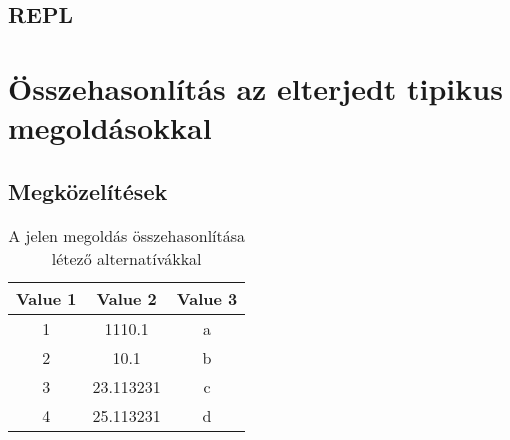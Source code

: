 \documentclass[
    parspace, %
    noindent, %
]{elteiktdk}[2023/10/30]
\begin{document}

\section{REPL}



\chapter{Összehasonlítás az elterjedt tipikus megoldásokkal}

\section{Megközelítések}



\begin{table}[h!]
  \begin{center}
    \begin{tabular}{|c|c|c|}
      \textbf{Value 1} &
      \textbf{Value 2} &
      \textbf{Value 3} \\
      \hline
      1 & 1110.1 & a\\
      2 & 10.1 & b\\
      3 & 23.113231 & c\\
      4 & 25.113231 & d\\ %
    \end{tabular}
    \caption{A jelen megoldás összehasonlítása létező alternatívákkal}
  \end{center}
\end{table}
\end{document}
